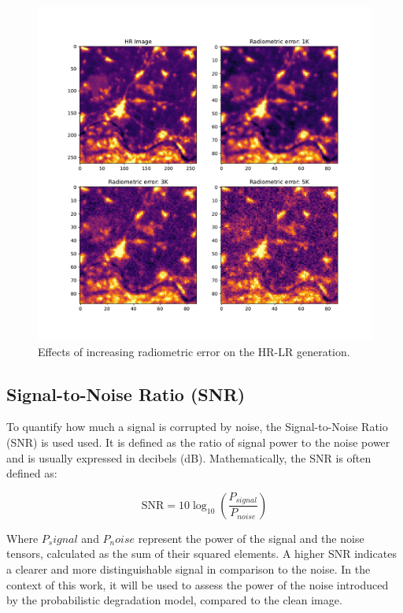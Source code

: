         \begin{figure}[h!]
            \centering
            \includegraphics[width=\textwidth]{Includes/4-radiometric_noise_example.pdf}
            \caption{Effects of increasing radiometric error on the HR-LR generation.}
            \label{fig:4-radiometric_noise_example}
        \end{figure}
        
    

    \subsection{Signal-to-Noise Ratio (SNR)}

        To quantify how much a signal is corrupted by noise, the Signal-to-Noise Ratio (SNR) is used used. It is defined as the ratio of signal power to the noise power and is usually expressed in decibels (dB). Mathematically, the SNR is often defined as:

        \[ \text{SNR} = 10 \log_{10} \left( \frac{P_{signal}}{P_{noise}} \right) \]

        Where $P_signal$ and $P_noise$ represent the power of the signal and the noise tensors, calculated as the sum of their squared elements.
        A higher SNR indicates a clearer and more distinguishable signal in comparison to the noise. In the context of this work, it will be used to assess the power of the noise introduced by the probabilistic degradation model, compared to the clean image.

